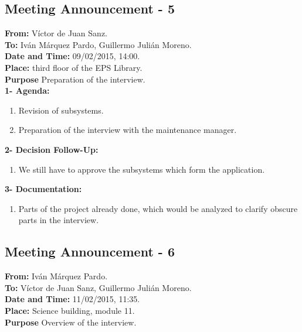 \subsection{Meeting Announcement - 5}

\textbf{From: } Víctor de Juan Sanz.\\
\textbf{To: } Iván Márquez Pardo, Guillermo Julián Moreno.\\
\textbf{Date and Time: } 09/02/2015, 14:00.\\
\textbf{Place: } third floor of the EPS Library.\\

\textbf{Purpose} Preparation of the interview. \\

\textbf{1- Agenda:}
\begin{enumerate}
\item Revision of subsystems.
\item Preparation of the interview with the maintenance manager.
\end{enumerate}
\textbf{2- Decision Follow-Up:} 
\begin{enumerate}
\item We still have to approve the subsystems which form the application.
\end{enumerate}
\textbf{3- Documentation:}
\begin{enumerate}
\item Parts of the project already done, which would be analyzed to clarify obscure parts in the interview.
\end{enumerate}

\subsection{Meeting Announcement - 6}

\textbf{From: } Iván Márquez Pardo.\\
\textbf{To: } Víctor de Juan Sanz, Guillermo Julián Moreno.\\
\textbf{Date and Time: } 11/02/2015, 11:35.\\
\textbf{Place: } Science building, module 11.\\

\textbf{Purpose} Overview of the interview. \\

